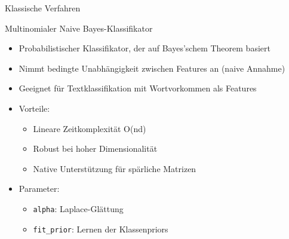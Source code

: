 \documentclass[aspectratio=169]{beamer} %
\begin{document}
\begin{frame}{Klassische Verfahren}
    \begin{block}{Multinomialer Naive Bayes-Klassifikator}
        \begin{itemize}
            \item Probabilistischer Klassifikator, der auf Bayes'schem Theorem basiert
            \item Nimmt bedingte Unabhängigkeit zwischen Features an (naive Annahme)
            \item Geeignet für Textklassifikation mit Wortvorkommen als Features
            \item Vorteile:
                  \begin{itemize}
                      \item Lineare Zeitkomplexität O(nd) %
                      \item Robust bei hoher Dimensionalität
                      \item Native Unterstützung für spärliche Matrizen
                  \end{itemize}
            \item Parameter:
                  \begin{itemize}
                      \item \texttt{alpha}: Laplace-Glättung
                      \item \texttt{fit\_prior}: Lernen der Klassenpriors
                  \end{itemize}
        \end{itemize}
    \end{block}
\end{frame}
\end{document}
